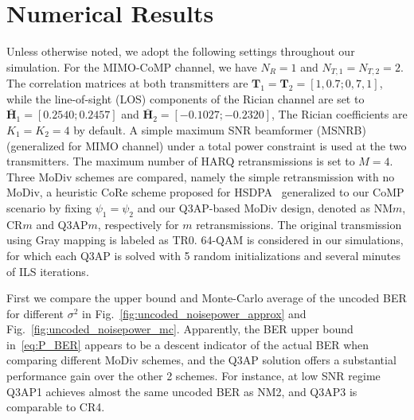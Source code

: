 \documentclass[journal]{IEEEtran}
\begin{document}
\section{Numerical Results}
\label{sec:numerical}
Unless otherwise noted, we adopt the following
settings throughout our simulation. For the MIMO-CoMP channel, we have $N_R=1$
and $N_{T, 1} = N_{T, 2} = 2$. The correlation matrices at both transmitters are
$\mathbf{T}_1 = \mathbf{T}_2 =[1,0.7;0,7,1]$, while the line-of-sight (LOS)
components of the Rician channel are set to $\bar{\mathbf{H}}_{1} = [0.2540;
0.2457]$ and $\bar{\mathbf{H}}_{2} = [-0.1027; -0.2320]$, 
The Rician coefficients are $K_1 = K_2 = 4$ by default. A simple maximum SNR
beamformer (MSNRB)~\cite{barriac2006space} (generalized for MIMO channel) under
a total power constraint is used at the two transmitters. 
The maximum number of HARQ retransmissions is set
to $M=4$. Three MoDiv schemes are compared, namely the simple retransmission with
no MoDiv, a heuristic CoRe scheme proposed for
HSDPA~\cite{panasonic2001enhanced} generalized to our CoMP scenario by fixing
$\psi_1 = \psi_2$ and our Q3AP-based MoDiv design, denoted
as NM$m$, CR$m$ and Q3AP$m$, respectively for $m$ retransmissions. The original
transmission using Gray mapping is labeled as TR0. 64-QAM is considered in our
simulations, for which each Q3AP is solved with 5 random initializations and
several minutes of ILS iterations.

First we compare the upper bound and Monte-Carlo average of the uncoded BER for
different $\sigma^2$ in Fig.~\ref{fig:uncoded_noisepower_approx} and 
Fig.~\ref{fig:uncoded_noisepower_mc}.
Apparently, the BER upper bound in~\eqref{eq:P_BER} appears to be a descent
indicator of the actual BER when comparing different MoDiv schemes, and the Q3AP
solution offers a substantial performance gain over the other 2 schemes. For
instance, at low SNR regime Q3AP1 achieves almost the same uncoded BER as NM2,
and Q3AP3 is comparable to CR4.
\end{document}
